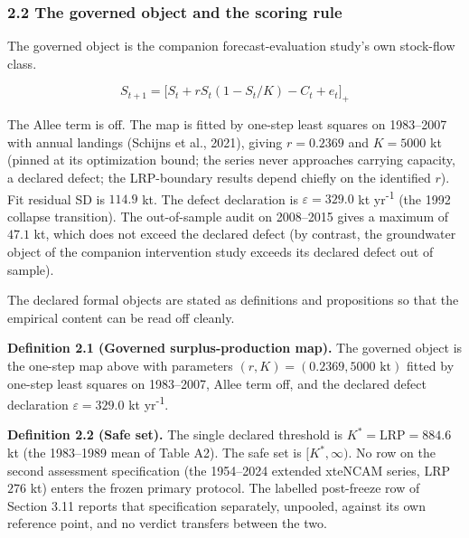 \documentclass[11pt]{article}
\begin{document}
\subsubsection{2.2 The governed object and the scoring
rule}\label{budget-the-governed-object-and-the-scoring-rule}

The governed object is the companion forecast-evaluation study's own
stock-flow class.

\[S_{t+1}=\bigl[S_t+rS_t(1-S_t/K)-C_t+e_t\bigr]_+\]

The Allee term is off. The map is fitted by one-step least squares on
1983--2007 with annual landings (Schijns et al., 2021), giving
\(r = 0.2369\) and \(K = 5000\) kt (pinned at its optimization bound;
the series never approaches carrying capacity, a declared defect; the
LRP-boundary results depend chiefly on the identified \(r\)). Fit
residual SD is \(114.9\) kt. The defect declaration is
\(\varepsilon = 329.0\) kt yr\textsuperscript{-1} (the 1992 collapse transition). The
out-of-sample audit on 2008--2015 gives a maximum of \(47.1\) kt, which
does not exceed the declared defect (by contrast, the groundwater object
of the companion intervention study exceeds its declared defect out of
sample).

The declared formal objects are stated as definitions and propositions
so that the empirical content can be read off cleanly.

\textbf{Definition 2.1 (Governed surplus-production map).} The governed
object is the one-step map above with parameters
\((r, K) = (0.2369, 5000\text{ kt})\) fitted by one-step least squares
on 1983--2007, Allee term off, and the declared defect declaration
\(\varepsilon = 329.0\) kt yr\textsuperscript{-1}.

\textbf{Definition 2.2 (Safe set).} The single declared threshold is
\(K^* = \mathrm{LRP} = 884.6\) kt (the 1983--1989 mean of Table A2). The
safe set is \([K^*, \infty)\). No row on the second assessment
specification (the 1954--2024 extended xteNCAM series, LRP \(276\) kt)
enters the frozen primary protocol. The labelled post-freeze row of
Section 3.11 reports that specification separately, unpooled, against
its own reference point, and no verdict transfers between the two.
\end{document}
